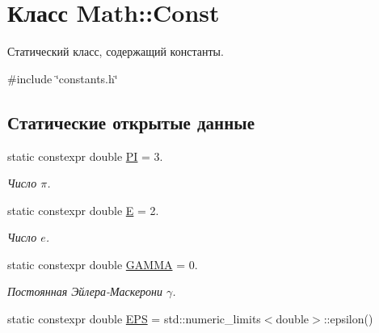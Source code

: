 \hypertarget{class_math_1_1_const}{}\section{Класс Math\+:\+:Const}
\label{class_math_1_1_const}


Статический класс, содержащий константы.  




{\ttfamily \#include \char`\"{}constants.\+h\char`\"{}}

\subsection*{Статические открытые данные}
\begin{DoxyCompactItemize}
\item 
static constexpr double \hyperlink{class_math_1_1_const_af38bf8b7900394c82b8cc61d56a1d761}{PI} = 3.\hypertarget{class_math_1_1_const_af38bf8b7900394c82b8cc61d56a1d761}{}\label{class_math_1_1_const_af38bf8b7900394c82b8cc61d56a1d761}

\begin{DoxyCompactList}\small\item\em Число $\pi$. \end{DoxyCompactList}\item 
static constexpr double \hyperlink{class_math_1_1_const_a48120c3c268ef1ebb4533908ae0c920f}{E} = 2.\hypertarget{class_math_1_1_const_a48120c3c268ef1ebb4533908ae0c920f}{}\label{class_math_1_1_const_a48120c3c268ef1ebb4533908ae0c920f}

\begin{DoxyCompactList}\small\item\em Число $e$. \end{DoxyCompactList}\item 
static constexpr double \hyperlink{class_math_1_1_const_ad1d689a22e84a3c7e49a47cf80b3050f}{G\+A\+M\+MA} = 0.\hypertarget{class_math_1_1_const_ad1d689a22e84a3c7e49a47cf80b3050f}{}\label{class_math_1_1_const_ad1d689a22e84a3c7e49a47cf80b3050f}

\begin{DoxyCompactList}\small\item\em Постоянная Эйлера-\/Маскерони $\gamma$. \end{DoxyCompactList}\item 
static constexpr double \hyperlink{class_math_1_1_const_a7058de10aeb68c8ac5df5a7346278d15}{E\+PS} = std\+::numeric\+\_\+limits$<$double$>$\+::epsilon()\hypertarget{class_math_1_1_const_a7058de10aeb68c8ac5df5a7346278d15}{}\label{class_math_1_1_const_a7058de10aeb68c8ac5df5a7346278d15}


\end{DoxyCompactItemize}
